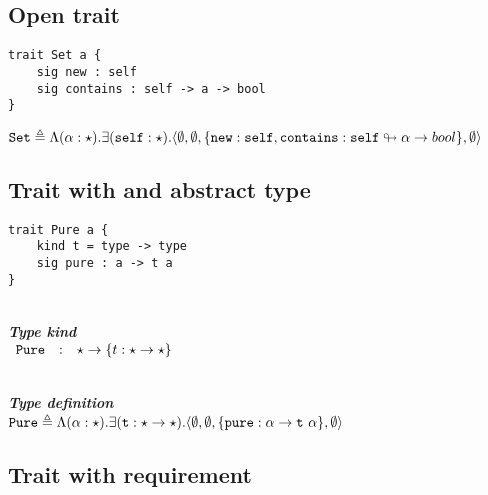 \documentclass{article}[11pt]
\newcommand{\subsubsubsection}[1]
{
    ~\\
    {\bf {\em #1}} \\
}
\newcommand{\term}[1]{\verb~#1~}
\begin{document}
    \subsection{Open trait}

    \begin{verbatim}
trait Set a {
    sig new : self
    sig contains : self -> a -> bool
}
    \end{verbatim}

    \noindent
    \begin{math}
        \term{Set} \triangleq \Lambda(\alpha:\star).\exists(\term{self}:\star).\langle
        \emptyset,
        \emptyset,
        \{ \term{new} : \term{self}, \term{contains} : \term{self} \looparrowright \alpha \rightarrow bool \},
        \emptyset
        \rangle
    \end{math}

    \subsection{Trait with and abstract type}\label{subsec:trait-with-and-abstract-type}

    \begin{verbatim}
trait Pure a {
    kind t = type -> type
    sig pure : a -> t a
}
    \end{verbatim}

    \subsubsubsection{Type kind}

    \noindent
    \begin{math}
        \begin{array}{rclp{5cm}}
            \term{Pure} & : & \star \rightarrow \{ t : \star \rightarrow \star \}
        \end{array}
    \end{math}

    \subsubsubsection{Type definition}

    \noindent
    \begin{math}
        \term{Pure} \triangleq \Lambda(\alpha:\star).\exists(\term{t}:\star \rightarrow \star).\langle
        \emptyset,
        \emptyset,
        \{ \term{pure} : \alpha \rightarrow \term{t}~\alpha \},
        \emptyset
        \rangle
    \end{math}

    \subsection{Trait with requirement}\label{subsec:trait-with-requirement}
\end{document}

